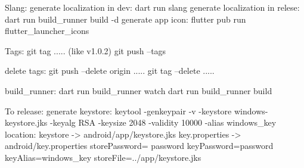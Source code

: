 Slang: 
     generate localization in dev: dart run slang
     generate localization in relese: dart run build_runner build -d
     generate app icon: flutter pub run flutter_launcher_icons

Tags: 
     git tag ..... (like v1.0.2)
     git push --tags

     delete tags:
          git push --delete origin .....
          git tag --delete .....

build_runner:
     dart run build_runner watch
     dart run build_runner build

To release: 
     generate keystore:
          keytool -genkeypair -v -keystore windows-keystore.jks -keyalg RSA -keysize 2048 -validity 10000 -alias windows_key
     location:
          keystore -> android/app/keystore.jks
          key.properties -> android/key.properties
               storePassword= {password}
               keyPassword={password}
               keyAlias=windows_key
               storeFile=../app/keystore.jks
